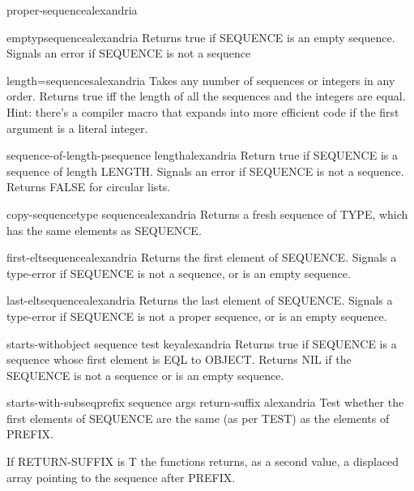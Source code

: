 \begin{type}{proper-sequence}{}{alexandria}{}
  
\end{type}

\begin{function}{emptyp}{sequence}{alexandria}{}
  Returns true if SEQUENCE is an empty sequence. Signals an error if SEQUENCE
is not a sequence
\end{function}

\begin{function}{length=}{\rest sequences}{alexandria}{}
  Takes any number of sequences or integers in any order. Returns true iff
the length of all the sequences and the integers are equal. Hint: there's a
compiler macro that expands into more efficient code if the first argument
is a literal integer.
\end{function}

\begin{function}{sequence-of-length-p}{sequence length}{alexandria}{}
  Return true if SEQUENCE is a sequence of length LENGTH. Signals an error if
SEQUENCE is not a sequence. Returns FALSE for circular lists.
\end{function}

\begin{function}{copy-sequence}{type sequence}{alexandria}{}
  Returns a fresh sequence of TYPE, which has the same elements as
SEQUENCE.
\end{function}

\begin{function}{first-elt}{sequence}{alexandria}{}
  Returns the first element of SEQUENCE. Signals a type-error if SEQUENCE is
not a sequence, or is an empty sequence.
\end{function}

\begin{function}{last-elt}{sequence}{alexandria}{}
  Returns the last element of SEQUENCE. Signals a type-error if SEQUENCE is
not a proper sequence, or is an empty sequence.
\end{function}

\begin{function}{starts-with}{object sequence \key test key}{alexandria}{}
  Returns true if SEQUENCE is a sequence whose first element is EQL to OBJECT.
Returns NIL if the SEQUENCE is not a sequence or is an empty sequence.
\end{function}

\begin{function}{starts-with-subseq}{prefix sequence \rest args \key return-suffix \akeys}{alexandria}{}
  Test whether the first elements of SEQUENCE are the same (as per TEST) as the elements of PREFIX.

If RETURN-SUFFIX is T the functions returns, as a second value, a
displaced array pointing to the sequence after PREFIX.
\end{function}

